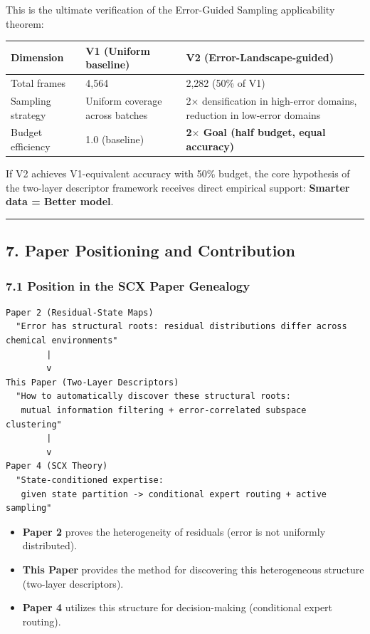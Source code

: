 \documentclass[
  12pt,
]{article}
\providecommand{\tightlist}{%
  \setlength{\itemsep}{0pt}\setlength{\parskip}{0pt}}
\begin{document}
This is the ultimate verification of the Error-Guided Sampling applicability theorem:

\begin{longtable}[]{@{}lll@{}}
\toprule\noalign{}
Dimension & V1 (Uniform baseline) & V2 (Error-Landscape-guided) \\
\midrule\noalign{}
\endhead
\bottomrule\noalign{}
\endlastfoot
Total frames & 4,564 & 2,282 (50\% of V1) \\
Sampling strategy & Uniform coverage across batches & 2$\times$ densification in high-error domains, reduction in low-error domains \\
Budget efficiency & 1.0 (baseline) & \textbf{2$\times$ Goal (half budget, equal accuracy)} \\
\end{longtable}

If V2 achieves V1-equivalent accuracy with 50\% budget, the core hypothesis of the two-layer descriptor framework receives direct empirical support: \textbf{Smarter data = Better model}.

\begin{center}\rule{0.5\linewidth}{0.5pt}\end{center}

\subsection{7. Paper Positioning and Contribution}\label{paper-positioning-and-contribution}

\subsubsection{7.1 Position in the SCX Paper Genealogy}\label{position-in-scx-paper-genealogy}

\begin{verbatim}
Paper 2 (Residual-State Maps)
  "Error has structural roots: residual distributions differ across chemical environments"
        |
        v
This Paper (Two-Layer Descriptors)
  "How to automatically discover these structural roots:
   mutual information filtering + error-correlated subspace clustering"
        |
        v
Paper 4 (SCX Theory)
  "State-conditioned expertise:
   given state partition -> conditional expert routing + active sampling"
\end{verbatim}

\begin{itemize}
\tightlist
\item
  \textbf{Paper 2} proves the heterogeneity of residuals (error is not uniformly distributed).
\item
  \textbf{This Paper} provides the method for discovering this heterogeneous structure (two-layer descriptors).
\item
  \textbf{Paper 4} utilizes this structure for decision-making (conditional expert routing).
\end{itemize}
\end{document}
